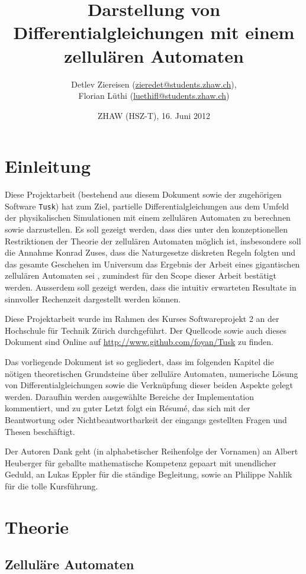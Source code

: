 \documentclass[11pt]{report} %
\title{Darstellung von Differentialgleichungen mit einem zellulären Automaten}
\author{Detlev Ziereisen (\url{zieredet@students.zhaw.ch}), \\ Florian Lüthi (\url{luethifl@students.zhaw.ch})}
\date{ZHAW (HSZ-T), 16. Juni 2012} %
\theoremstyle{definition}
\begin{document}
\maketitle

\tableofcontents

\chapter{Einleitung}

Diese Projektarbeit (bestehend aus diesem Dokument sowie der zugehörigen Software {\tt Tusk}) hat zum Ziel, partielle Differentialgleichungen aus dem Umfeld der physikalischen Simulationen mit einem zellulären Automaten zu berechnen sowie darzustellen. Es soll gezeigt werden, dass dies unter den konzeptionellen Restriktionen der Theorie der zellulären Automaten möglich ist, insbesondere soll die Annahme Konrad Zuses, dass die Naturgesetze diskreten Regeln folgten und das gesamte Geschehen im Universum das Ergebnis der Arbeit eines gigantischen zellulären Automaten sei \cite{wiki:zellautomat, zuse1969}, zumindest für den Scope dieser Arbeit bestätigt werden. Ausserdem soll gezeigt werden, dass die intuitiv erwarteten Resultate in sinnvoller Rechenzeit dargestellt werden können.

Diese Projektarbeit wurde im Rahmen des Kurses Softwareprojekt 2 an der Hochschule für Technik Zürich durchgeführt. Der Quellcode sowie auch dieses Dokument sind Online auf \url{http://www.github.com/foyan/Tusk} zu finden.

Das vorliegende Dokument ist so gegliedert, dass im folgenden Kapitel die nötigen theoretischen Grundsteine über zelluläre Automaten, numerische Lösung von Differentialgleichungen sowie die Verknüpfung dieser beiden Aspekte gelegt werden. Daraufhin werden ausgewählte Bereiche der Implementation kommentiert, und zu guter Letzt folgt ein Résumé, das sich mit der Beantwortung oder Nichtbeantwortbarkeit der eingangs gestellten Fragen und Thesen beschäftigt.

Der Autoren Dank geht (in alphabetischer Reihenfolge der Vornamen) an Albert Heuberger für geballte mathematische Kompetenz gepaart mit unendlicher Geduld, an Lukas Eppler für die ständige Begleitung, sowie an Philippe Nahlik für die tolle Kursführung.

\chapter{Theorie}

\section{Zelluläre Automaten}
\end{document}

